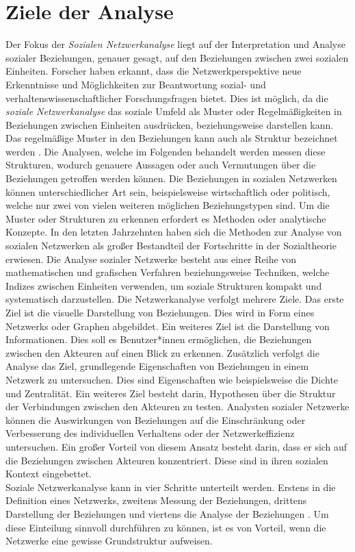 \section{Ziele der Analyse}
Der Fokus der \textit{Sozialen Netzwerkanalyse} liegt auf der Interpretation und Analyse sozialer Beziehungen, genauer gesagt, auf den Beziehungen zwischen zwei sozialen Einheiten. Forscher haben erkannt, dass die Netzwerkperspektive neue Erkenntnisse und Möglichkeiten zur Beantwortung sozial- und verhaltenswissenschaftlicher Forschungsfragen bietet. Dies ist möglich, da die \textit{soziale Netzwerkanalyse} das soziale Umfeld als Muster oder Regelmäßigkeiten in Beziehungen zwischen Einheiten ausdrücken, beziehungsweise darstellen kann. Das regelmäßige Muster in den Beziehungen kann auch als Struktur bezeichnet werden \cite{wasserman1994social}. Die Analysen, welche im Folgenden behandelt werden messen diese Strukturen, wodurch genauere Aussagen oder auch Vermutungen über die Beziehungen getroffen werden können. Die Beziehungen in sozialen Netzwerken können unterschiedlicher Art sein, beispielsweise wirtschaftlich oder politisch, welche nur zwei von vielen weiteren möglichen Beziehungstypen sind. Um die Muster oder Strukturen zu erkennen erfordert es Methoden oder analytische Konzepte. In den letzten Jahrzehnten haben sich die Methoden zur Analyse von sozialen Netzwerken als großer Bestandteil der Fortschritte in der Sozialtheorie erwiesen.
Die Analyse sozialer Netzwerke besteht aus einer Reihe von mathematischen und grafischen Verfahren beziehungsweise Techniken, welche Indizes zwischen Einheiten verwenden, um soziale Strukturen kompakt und systematisch darzustellen.
Die Netzwerkanalyse verfolgt mehrere Ziele. Das erste Ziel ist die visuelle Darstellung von Beziehungen. Dies wird in Form eines Netzwerks oder Graphen abgebildet. Ein weiteres Ziel ist die Darstellung von Informationen. Dies soll es Benutzer*innen ermöglichen, die Beziehungen zwischen den Akteuren auf einen Blick zu erkennen. Zusätzlich verfolgt die Analyse das Ziel, grundlegende Eigenschaften von Beziehungen in einem Netzwerk zu untersuchen. Dies sind Eigenschaften wie beispielsweise die Dichte und Zentralität. Ein weiteres Ziel besteht darin, Hypothesen über die Struktur der Verbindungen zwischen den Akteuren zu testen. Analysten sozialer Netzwerke können die Auswirkungen von Beziehungen auf die Einschränkung oder Verbesserung des individuellen Verhaltens oder der Netzwerkeffizienz untersuchen. Ein großer Vorteil von diesem Ansatz besteht darin, dass er sich auf die Beziehungen zwischen Akteuren konzentriert. Diese sind in ihren sozialen Kontext eingebettet.\\
Soziale Netzwerkanalyse kann in vier Schritte unterteilt werden. Erstens in die Definition eines Netzwerks, zweitens Messung der Beziehungen, drittens Darstellung der Beziehungen und viertens die Analyse der Beziehungen \cite{wasserman1994social}. Um diese Einteilung sinnvoll durchführen zu können, ist es von Vorteil, wenn die Netzwerke eine gewisse Grundstruktur aufweisen.

